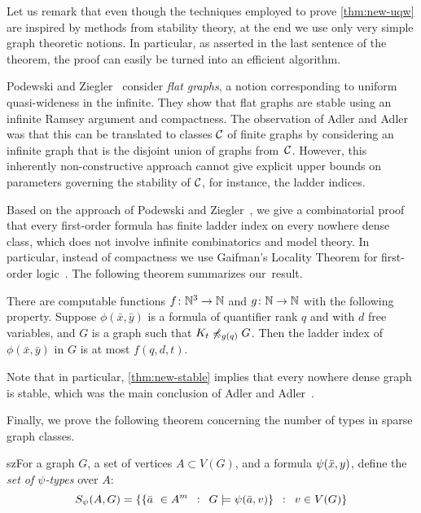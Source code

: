 Let us remark
that even though the techniques employed to prove \cref{thm:new-uqw} are inspired by methods from stability theory, 
at the end we use only very simple graph theoretic notions. In particular, as asserted in the last sentence of the theorem, the
proof can easily be turned into an efficient algorithm.

 Podewski and Ziegler~\cite{podewski1978stable} 
consider \emph{flat graphs}, a notion corresponding to uniform quasi-wideness in the 
infinite. They show that  flat graphs are stable using an 
infinite Ramsey argument and compactness. The observation of Adler and Adler~\cite{adler2014interpreting} was that
this can be translated to classes $\mathcal{C}$ of finite graphs by considering an infinite graph that is the disjoint union of graphs from~$\mathcal{C}$.
However, this inherently non-constructive approach cannot give explicit upper bounds on parameters governing the stability of $\mathcal{C}$, for instance, the ladder indices.

Based on the approach of Podewski and Ziegler~\cite{podewski1978stable}, we give a combinatorial 
proof that every first-order formula has finite ladder index on every
nowhere dense class, which does not involve infinite combinatorics and model theory.
In particular, instead of compactness we use Gaifman's Locality Theorem for
first-order logic~\cite{gaifman1982local}. The following theorem summarizes our~result.

\begin{theorem}\label{thm:new-stable}
  There are computable functions $f\colon \mathbb{N}^3\to\mathbb{N}$ and $g\colon\mathbb{N}\to\mathbb{N}$ with the following property.
Suppose $\phi(\bar x,\bar y)$ is a formula of quantifier rank $q$ and with $d$ free variables,
and $G$ is a graph such that $K_t\not\preccurlyeq_{g(q)} G$. Then the ladder index of $\phi(\bar x,\bar y)$ in $G$ is at most $f(q,d,t)$.
\end{theorem}

Note that in particular, \cref{thm:new-stable} implies that every nowhere dense graph is stable, which was the main conclusion of Adler and Adler~\cite{adler2014interpreting}.

\bigskip
Finally, we prove the following theorem concerning the number of
types in sparse graph classes. 
\begin{change}{sz}For a graph $G$, a set of vertices $A\subset V(G)$, and a formula $\psi(\bar{x}, y)$, define the \emph{set of $\psi$-types} over $A$:
\[S_\psi(A,G)=\left\{\left\{\bar{a}\ \in A^m \,~:~\, G\models\psi(\bar{a},v) \right\} \,~:~\,  v\in V(G) \right\}\]
\end{change}


